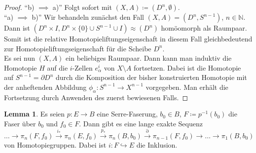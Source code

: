 \documentclass[11pt, a4paper, german]{article}
\theoremstyle{definition}
\newtheorem{lem}{Lemma}
\theoremstyle{remark}
\newcommand{\N}{\mathbb{N}} %
\newcommand{\ES}{Es sei} %
\newcommand{\ESn}{Es seien} %
\newcommand{\I}{I} %
\begin{document}
\begin{proof}
  "`b) $\implies$ a)"' \enspace Folgt sofort mit $(X, A) \coloneqq (D^n, \emptyset)$. \\[2pt]
  "`a) $\implies$ b)"' \enspace Wir behandeln zunächst den Fall $(X, A) = (D^n, S^{n-1})$, $n \in \N$. Dann ist $(D^n \times \I, D^n \times \{ 0 \} \cup S^{n-1} \cup \I) \approx (D^n)$ homöomorph als Raumpaar.
  Somit ist die relative Homotopieliftungseigenschaft in diesem Fall gleichbedeutend zur Homotopieliftungseigenschaft für die Scheibe $D^n$. \\
  \ES{} nun $(X, A)$ ein beliebiges Raumpaar.
  Dann kann man induktiv die Homotopie $H$ auf die $i$-Zellen $e^i_\alpha$ von $X \setminus A$ fortsetzen.
  Dabei ist die Homotopie auf $S^{n-1} = \partial D^n$ durch die Komposition der bisher konstruierten Homotopie mit der anheftenden Abbildung $\phi_\alpha : S^{n-1} \to X^{n-1}$ vorgegeben.
  Man erhält die Fortsetzung durch Anwenden des zuerst bewiesenen Falls.
\end{proof}

\begin{lem}
  \ESn{} $p : E \to B$ eine Serre-Faserung, $b_0 \in B$, $F \coloneqq p^{-1}(b_0)$ die Faser über $b_0$ und $f_0 \in F$.
  Dann gibt es eine lange exakte Sequenz
  \[ \ldots \to \pi_n(F, f_0) \xrightarrow{i_*} \pi_n(E, f_0) \xrightarrow{p_*} \pi_n(B, b_0) \xrightarrow{\partial} \pi_{n-1}(F, f_0) \to \ldots \to \pi_1(B, b_0) \]
  von Homotopiegruppen.
  Dabei ist $i : F \hookrightarrow E$ die Inklusion.
\end{lem}
\end{document}

